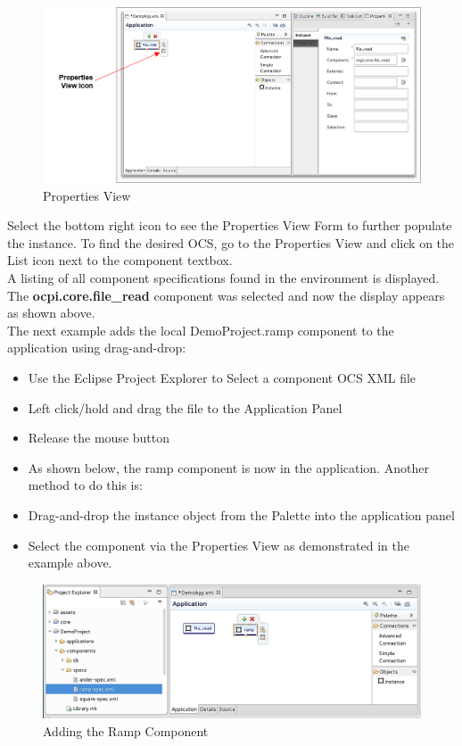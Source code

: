 \documentclass[10pt, a4paper, oneside]{article}
\begin{document}
\begin{figure}[h!]
	\centering
	\caption{Properties View}{}
	\includegraphics[width=\textwidth]{PropertiesView.png}
 \end{figure}
\bigskip
Select the bottom right icon to see the Properties View Form to further populate the instance. To find the desired OCS, go to the Properties View and click on the List icon next to the component textbox.\\

A listing of all component specifications found in the environment is displayed. The \textbf{ocpi.core.file\_read} component was selected and now the display appears as shown above.\\

The next example adds the local DemoProject.ramp component to the application using drag-and-drop:
\begin{itemize}
\item	Use the Eclipse Project Explorer to Select a component OCS XML file
\item	Left click/hold and drag the file to the Application Panel
\item	Release the mouse button
\item[] As shown below, the ramp component is now in the application. Another method to do this is:
\item	Drag-and-drop the instance object from the Palette into the application panel
\item	Select the component via the Properties View as demonstrated in the example above.
\end{itemize}
\begin{figure}[h!]
	\centering
	\caption{Adding the Ramp Component}{}
	\includegraphics[width=.95\textwidth]{AddingtheRampComponent.png}
 \end{figure}
\end{document}
